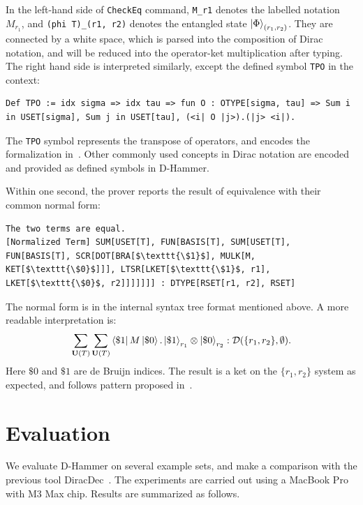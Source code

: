 In the left-hand side of \texttt{\textcolor{NavyBlue}{CheckEq}} command, \texttt{M\_r1} denotes the labelled notation $M_{r_1}$, and \texttt{(phi T)\_(r1, r2)} denotes the entangled state $\ket{\Phi}_{(r_1, r_2)}$. They are connected by a white space, which is parsed into the composition of Dirac notation, and will be reduced into the operator-ket multiplication after typing. The right hand side is interpreted similarly, except the defined symbol \texttt{TPO} in the context:

\begin{lstlisting}[style=dhammer]
Def TPO := idx sigma => idx tau => fun O : OTYPE[sigma, tau] => Sum i in USET[sigma], Sum j in USET[tau], (<i| O |j>).(|j> <i|).
\end{lstlisting}

The \texttt{TPO} symbol represents the transpose of operators, and encodes the formalization in~. Other commonly used concepts in Dirac notation are encoded and provided as defined symbols in D-Hammer.

Within one second, the prover reports the result of equivalence with their common normal form:
    \begin{lstlisting}[style=dhammer]
The two terms are equal.
[Normalized Term] SUM[USET[T], FUN[BASIS[T], SUM[USET[T], FUN[BASIS[T], SCR[DOT[BRA[$\texttt{\$1}$], MULK[M, KET[$\texttt{\$0}$]]], LTSR[LKET[$\texttt{\$1}$, r1], LKET[$\texttt{\$0}$, r2]]]]]]] : DTYPE[RSET[r1, r2], RSET]
    \end{lstlisting}

The normal form is in the internal syntax tree format mentioned above. A more readable interpretation is:
\[
\sum_{\mathbf{U}(T)} \sum_{\mathbf{U}(T)} \bra{\$1}M\ket{\$ 0} . \ket{\$1}_{r_1} \otimes \ket{\$0}_{r_2} : \mathcal{D}(\{r_1, r_2\}, \emptyset).
\]
Here $\$0$ and $\$1$ are de Bruijn indices. The result is a ket on the $\{r_1, r_2\}$ system as expected, and follows pattern proposed in~.



\section{Evaluation}\label{sec:eval}
We evaluate D-Hammer on several example sets, and make a comparison with the previous tool DiracDec~\cite{diracdec}.
The experiments are carried out using a MacBook Pro with M3 Max chip. Results are summarized as follows.


